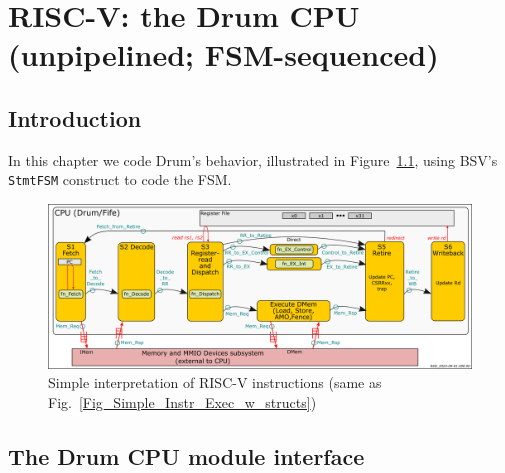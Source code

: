 

\chapter{RISC-V: the Drum CPU \\
(unpipelined; FSM-sequenced)}


\setcounter{page}{1}
\renewcommand{\thepage}{\arabic{chapter}-\arabic{page}}

\label{ch_Drum_code}


\section{Introduction}

In this chapter we code Drum's behavior, illustrated in
Figure~\ref{Fig_Drum_Instr_Exec}, using BSV's \verb|StmtFSM|
construct to code the FSM.
\begin{figure}[htbp]
  \centerline{\includegraphics[width=6in,angle=0]{Figures/RSN_2025-09-01.000.00_FifeDrum_Stages_Multilayer_L1_L3}}
  \caption{\label{Fig_Drum_Instr_Exec}
           Simple interpretation of RISC-V instructions
	   (same as Fig.~\ref{Fig_Simple_Instr_Exec_w_structs})}
\end{figure}


\section{The Drum CPU module interface}

